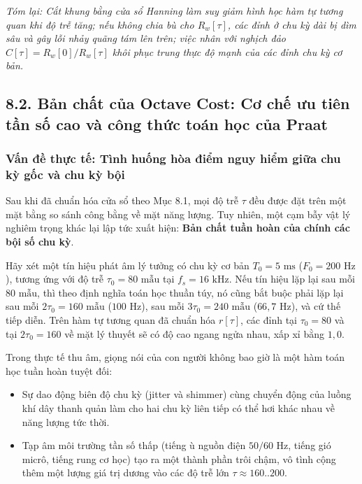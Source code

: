 \textit{Tóm lại: Cắt khung bằng cửa sổ Hanning làm suy giảm hình học hàm tự tương quan khi độ trễ tăng; nếu không chia bù cho $R_w[\tau]$, các đỉnh ở chu kỳ dài bị dìm sâu và gây lỗi nhảy quãng tám lên trên; việc nhân với nghịch đảo $C[\tau] = R_w[0]/R_w[\tau]$ khôi phục trung thực độ mạnh của các đỉnh chu kỳ cơ bản.}


\subsection*{8.2. Bản chất của Octave Cost: Cơ chế ưu tiên tần số cao và công thức toán học của Praat}

\subsubsection*{Vấn đề thực tế: Tình huống hòa điểm nguy hiểm giữa chu kỳ gốc và chu kỳ bội}
Sau khi đã chuẩn hóa cửa sổ theo Mục 8.1, mọi độ trễ $\tau$ đều được đặt trên một mặt bằng so sánh công bằng về mặt năng lượng. Tuy nhiên, một cạm bẫy vật lý nghiêm trọng khác lại lập tức xuất hiện: \textbf{Bản chất tuần hoàn của chính các bội số chu kỳ}.

Hãy xét một tín hiệu phát âm lý tưởng có chu kỳ cơ bản $T_0 = 5\text{ ms}$ ($F_0 = 200\text{ Hz}$), tương ứng với độ trễ $\tau_0 = 80\text{ mẫu}$ tại $f_s = 16\text{ kHz}$. Nếu tín hiệu lặp lại sau mỗi $80\text{ mẫu}$, thì theo định nghĩa toán học thuần túy, nó cũng bắt buộc phải lặp lại sau mỗi $2\tau_0 = 160\text{ mẫu}$ ($100\text{ Hz}$), sau mỗi $3\tau_0 = 240\text{ mẫu}$ ($66{,}7\text{ Hz}$), và cứ thế tiếp diễn. Trên hàm tự tương quan đã chuẩn hóa $r[\tau]$, các đỉnh tại $\tau_0 = 80$ và tại $2\tau_0 = 160$ về mặt lý thuyết sẽ có độ cao ngang ngửa nhau, xấp xỉ bằng $1{,}0$.

Trong thực tế thu âm, giọng nói của con người không bao giờ là một hàm toán học tuần hoàn tuyệt đối:
\begin{itemize}[leftmargin=1.5em, itemsep=2pt]
    \item Sự dao động biên độ chu kỳ (jitter và shimmer) cùng chuyển động của luồng khí dây thanh quản làm cho hai chu kỳ liên tiếp có thể hơi khác nhau về năng lượng tức thời.
    \item Tạp âm môi trường tần số thấp (tiếng ù nguồn điện $50/60\text{ Hz}$, tiếng gió micrô, tiếng rung cơ học) tạo ra một thành phần trôi chậm, vô tình cộng thêm một lượng giá trị dương vào các độ trễ lớn $\tau \approx 160..200$.
\end{itemize}

